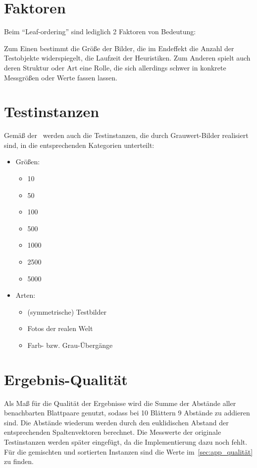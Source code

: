 \documentclass[a4paper, 10pt, twoside, onecolumn, parskip]{scrartcl}
\begin{document}
    \section{Faktoren} \label{sec:faktoren}

    Beim \enquote{Leaf-ordering} sind lediglich 2 Faktoren von Bedeutung:

    Zum Einen bestimmt die Größe der Bilder, die im Endeffekt die Anzahl der Testobjekte widerspiegelt, die Laufzeit der Heuristiken.
    Zum Anderen spielt auch deren Struktur oder Art eine Rolle, die sich allerdings schwer in konkrete Messgrößen oder Werte fassen lassen.

    \section{Testinstanzen} \label{sec:testinstanzen}

    Gemäß der~ werden auch die Testinstanzen, die durch Grauwert-Bilder realisiert sind, in die entsprechenden Kategorien unterteilt:
    \begin{itemize}
        \item Größen:
        \begin{itemize}
            \item 10
            \item 50
            \item 100
            \item 500
            \item 1000
            \item 2500
            \item 5000
        \end{itemize}
        \item Arten:
        \begin{itemize}
            \item (symmetrische) Testbilder
            \item Fotos der realen Welt
            \item Farb- bzw. Grau-Übergänge
        \end{itemize}
    \end{itemize}

    \section{Ergebnis-Qualität} \label{sec:qualität}

    Als Maß für die Qualität der Ergebnisse wird die Summe der Abstände aller benachbarten Blattpaare genutzt, sodass bei 10 Blättern 9 Abstände zu addieren sind.
    Die Abstände wiederum werden durch den euklidischen Abstand der entsprechenden Spaltenvektoren berechnet.
    Die Messwerte der originale Testinstanzen werden später eingefügt, da die Implementierung dazu noch fehlt.
    Für die gemischten und sortierten Instanzen sind die Werte im~\autoref{sec:app_qualität} zu finden.
\end{document}
